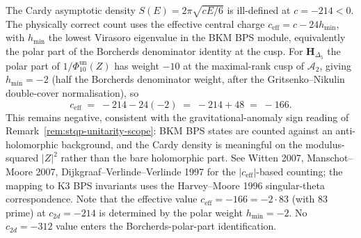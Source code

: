 \begin{remark}[Cardy counting at $c = -214$; \ClaimStatusProvedElsewhere]
\label{rem:stqp-cardy}
The Cardy asymptotic density $S(E) = 2\pi\sqrt{c E/6}$ is ill-defined
at $c = -214 < 0$. The physically correct count uses the effective
central charge $c_{\mathrm{eff}} = c - 24 h_{\min}$, with
$h_{\min}$ the lowest Virasoro eigenvalue in the BKM BPS module,
equivalently the polar part of the Borcherds denominator identity
at the cusp. For $\mathbf H_{\Delta_5}$ the polar part of
$1/\Phi_{10}^{\mathrm{un}}(Z)$ has weight $-10$ at the maximal-rank cusp of
$\mathcal A_2$, giving $h_{\min} = -2$ (half the Borcherds
denominator weight, after the Gritsenko--Nikulin double-cover
normalisation), so
\[
c_{\mathrm{eff}} \;=\; -214 - 24(-2) \;=\; -214 + 48 \;=\; -166.
\]
This remains negative, consistent with the gravitational-anomaly
sign reading of Remark~\ref{rem:stqp-unitarity-scope}:
BKM BPS states are counted against an anti-holomorphic background,
and the Cardy density is meaningful on the modulus-squared
$|Z|^2$ rather than the bare holomorphic part.
See Witten 2007, Manschot--Moore 2007, Dijkgraaf--Verlinde--Verlinde
1997 for the $|c_{\mathrm{eff}}|$-based counting; the mapping to
K3 BPS invariants uses the Harvey--Moore 1996 singular-theta
correspondence. Note that the effective value
$c_{\mathrm{eff}} = -166 = -2\cdot 83$ (with $83$ prime) at
$c_{2d} = -214$ is determined by the polar weight
$h_{\min}=-2$. No $c_{2d}=-312$ value enters the
Borcherds-polar-part identification.
\end{remark}

